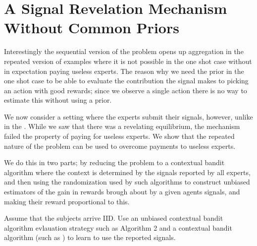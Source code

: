 



\section{A Signal Revelation Mechanism Without Common Priors}

Interestingly the sequential version of the problem opens up aggregation in the repeated version of examples where it is not possible in the one shot case without in expectation paying useless experts. 
The reason why we need the prior in the one shot case to be able to evaluate the contribution the signal makes to picking an action with good rewards; since we observe a single action there is no way to estimate this without using a prior. 

We now consider a setting where the experts submit their signals, however, unlike in the .
 While we saw that there was a revelating equilibrium, the mechanism failed the property of paying for useless experts. We show that the repeated nature of the problem can be used to overcome payments to useless experts. 

We do this in two parts; by reducing the problem to a contextual bandit algorithm where the context is determined by the signals reported by all experts, and then using the randomization used by such algorithms to construct unbiased estimators of the gain in rewards brough about by a given agents signals, and making their reward proportional to this.


Assume that the subjects arrive IID. Use an unbiased contextual bandit algorithm evlauation strategy such as \cite{li2011unbiased}  Algorithm 2 and a contextual bandit algorithm (such as \cite{syrgkanis2016efficient}) to learn to use the reported signals. %


